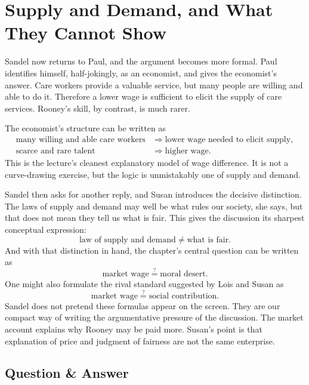 \section{Supply and Demand, and What They Cannot Show}

Sandel now returns to Paul, and the argument becomes more formal. Paul identifies himself, half-jokingly, as an economist, and gives the economist's answer. Care workers provide a valuable service, but many people are willing and able to do it. Therefore a lower wage is sufficient to elicit the supply of care services. Rooney's skill, by contrast, is much rarer.

The economist's structure can be written as
\begin{align}
\text{many willing and able care workers}
&\Longrightarrow
\text{lower wage needed to elicit supply},\\
\text{scarce and rare talent}
&\Longrightarrow
\text{higher wage}.
\end{align}
This is the lecture's cleanest explanatory model of wage difference. It is not a curve-drawing exercise, but the logic is unmistakably one of supply and demand.

Sandel then asks for another reply, and Susan introduces the decisive distinction. The laws of supply and demand may well be what rules our society, she says, but that does not mean they tell us what is fair. This gives the discussion its sharpest conceptual expression:
\begin{equation}
\text{law of supply and demand}
\neq
\text{what is fair}.
\end{equation}
And with that distinction in hand, the chapter's central question can be written as
\begin{equation}
\text{market wage}
\stackrel{?}{=}
\text{moral desert}.
\end{equation}
One might also formulate the rival standard suggested by Lois and Susan as
\begin{equation}
\text{market wage}
\stackrel{?}{=}
\text{social contribution}.
\end{equation}
Sandel does not pretend these formulas appear on the screen. They are our compact way of writing the argumentative pressure of the discussion. The market account explains why Rooney may be paid more. Susan's point is that explanation of price and judgment of fairness are not the same enterprise.

\subsection{Question \& Answer}

